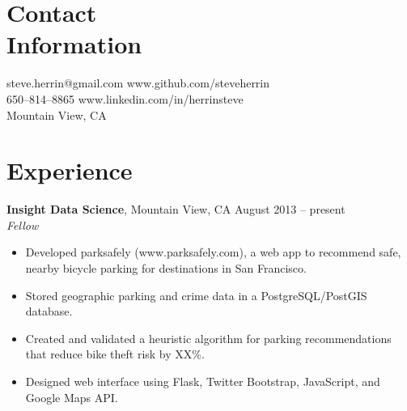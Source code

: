 \documentclass[margin,line]{resume}
\begin{document}
\begin{resume}

    \section{\mysidestyle Contact\\Information}

    steve.herrin@gmail.com		\hfill www.github.com/steveherrin		\vspace{0mm}\\\vspace{0mm}%
    650--814--8865				\hfill www.linkedin.com/in/herrinsteve	\vspace{0mm}\\\vspace{-4.5mm}%
    Mountain View, CA			\hfill								\vspace{0mm}\\\vspace{0mm}%
    
    \section{\mysidestyle Experience}
    
    \textbf{Insight Data Science}, Mountain View, CA \hfill August 2013 -- present\vspace{1mm}\\\vspace{1mm}%
    \textsl{Fellow}
    \begin{itemize}
    \item Developed parksafely (www.parksafely.com), a web app to recommend safe, nearby bicycle parking for destinations in San Francisco.
    \item Stored geographic parking and crime data in a PostgreSQL/PostGIS database.
    \item Created and validated a heuristic algorithm for parking recommendations that reduce bike theft risk by XX\%.
    \item Designed web interface using Flask, Twitter Bootstrap, JavaScript, and Google Maps API.
    \end{itemize}


\end{resume}
\end{document}

